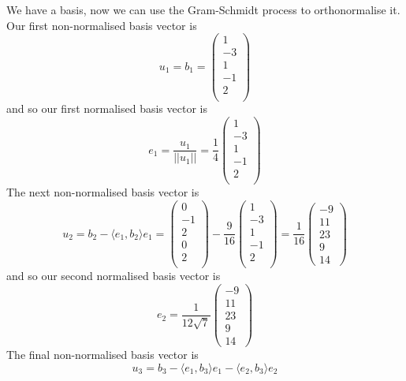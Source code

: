 \documentclass{article}
\newcommand{\chapternumber}{3}
\newenvironment{QandA}{\begin{enumerate}[label=\chapternumber.\arabic*]\bfseries\boldmath}
	{\end{enumerate}}
\newenvironment{answered}{\par\bigskip\normalfont\unboldmath}{}
\begin{document}
\begin{QandA}
\begin{answered}
			We have a basis, now we can use the Gram-Schmidt process to orthonormalise it.
			Our first non-normalised basis vector is 
			\[u_1 = b_1 = 
			\begin{pmatrix}
				1 \\ -3 \\  1 \\ -1 \\  2 \\
			\end{pmatrix}
			\]
			and so our first normalised basis vector is 
			\[
			e_1 = \frac{u_1}{||u_1||}=
			\frac{1}{4}
			\begin{pmatrix}
				1 \\ -3 \\  1 \\ -1 \\  2 \\
			\end{pmatrix}
			\]
			The next non-normalised basis vector is 
			\[
			u_2 = b_2-\langle e_1,b_2 \rangle e_1 = 
			\begin{pmatrix}
				0 \\ -1 \\  2 \\  0 \\  2 \\
			\end{pmatrix}
			-\frac{9}{16}
			\begin{pmatrix}
				1 \\ -3 \\  1 \\ -1 \\  2 \\
			\end{pmatrix}
			=
			\frac{1}{16}
			\begin{pmatrix}
				-9 \\
				11 \\
				23 \\
				9 \\
				14
			\end{pmatrix}
			\]
			and so our second normalised basis vector is
			\[e_2 = \frac{1}{12\sqrt{7}}
			\begin{pmatrix}
				-9 \\
				11 \\
				23 \\
				9 \\
				14
			\end{pmatrix}
			\]
			The final non-normalised basis vector is 
			\[
			u_3 = b_3 - \langle e_1,b_3 \rangle e_1 - \langle e_2,b_3 \rangle e_2
\]
\end{answered}
\end{QandA}
\end{document}
